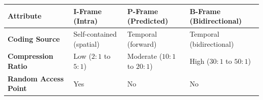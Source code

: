 \documentclass[12pt,a4paper]{article}
\renewcommand{\arraystretch}{1.45}
\begin{document}
\begin{tcolorbox}[tikzbox, title={Comparison of Video Frame Types}]
\centering
{\renewcommand{\arraystretch}{1.55}%
\begin{tabularx}{\linewidth}{|>{\bfseries}B{3.2cm}|Y|Y|Y|}
\hline
Attribute & I-Frame (Intra) & P-Frame (Predicted) & B-Frame (Bidirectional) \\
\hline
Coding Source & Self-contained (spatial) & Temporal (forward) & Temporal (bidirectional) \\
\hline
Compression Ratio & Low ($2:1$ to $5:1$) & Moderate ($10:1$ to $20:1$) & High ($30:1$ to $50:1$) \\
\hline
Random Access Point & Yes & No & No \\
\hline
\end{tabularx}}
\end{tcolorbox}
\end{document}
